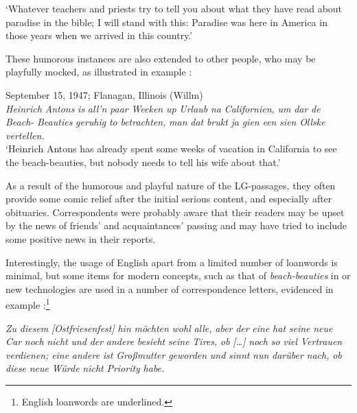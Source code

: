 \documentclass[output=paper]{langsci/langscibook}
\begin{document}
‘Whatever teachers and priests try to tell you about what they have read about paradise in the bible; I will stand with this: Paradise was here in America in those years when we arrived in this country.’
\z

These humorous instances are also extended to other people, who may be playfully mocked, as illustrated in example :

  
\ea
\label{ex:rocker:13} 
September 15, 1947; Flanagan, Illinois (Willm)\\
  
\textit{Heinrich} \textit{Antons} \textit{is} \textit{all’n} \textit{paar} \textit{Weeken} \textit{up} \textit{Urlaub} \textit{na} \textit{Californien,} \textit{um} \textit{dar} \textit{de} \textit{Beach-} \textit{Beauties} \textit{geruhig} \textit{to} \textit{betrachten,} \textit{man} \textit{dat} \textit{brukt} \textit{ja} \textit{gien} \textit{een} \textit{sien} \textit{Ollske} \textit{vertellen.}\\

‘Heinrich Antons has already spent some weeks of vacation in California to see the  beach-beauties, but nobody needs to tell his wife about that.’
\z

As a result of the humorous and playful nature of the LG-passages, they often provide some comic relief after the initial serious content, and especially after obituaries. Correspondents were probably aware that their readers may be upset by the news of friends’ and acquaintances’ passing and may have tried to include some positive news in their reports. 

Interestingly, the usage of English apart from a limited number of loanwords is minimal, but some items for modern concepts, such as that of \textit{beach-beauties} in  or new technologies are used in a number of correspondence letters, evidenced in example :\footnote{English loanwords are underlined.}
 
\ea
\label{ex:rocker:14} 
\textit{Zu} \textit{diesem} \textit{[Ostfriesenfest]} \textit{hin} \textit{möchten} \textit{wohl} \textit{alle,} \textit{aber} \textit{der} \textit{eine} \textit{hat} \textit{seine} \textit{neue} \textit{Car} \textit{noch} \textit{nicht} \textit{und} \textit{der} \textit{andere} \textit{besieht} \textit{seine} \textit{Tires,} \textit{ob} \textit{[…]} \textit{noch} \textit{so} \textit{viel} \textit{Vertrauen} \textit{verdienen;} \textit{eine} \textit{andere} \textit{ist} \textit{Großmutter} \textit{geworden} \textit{und} \textit{sinnt} \textit{nun} \textit{darüber} \textit{nach,} \textit{ob} \textit{diese} \textit{neue} \textit{Würde} \textit{nicht} \textit{Priority} \textit{habe.}\\
\end{document}

